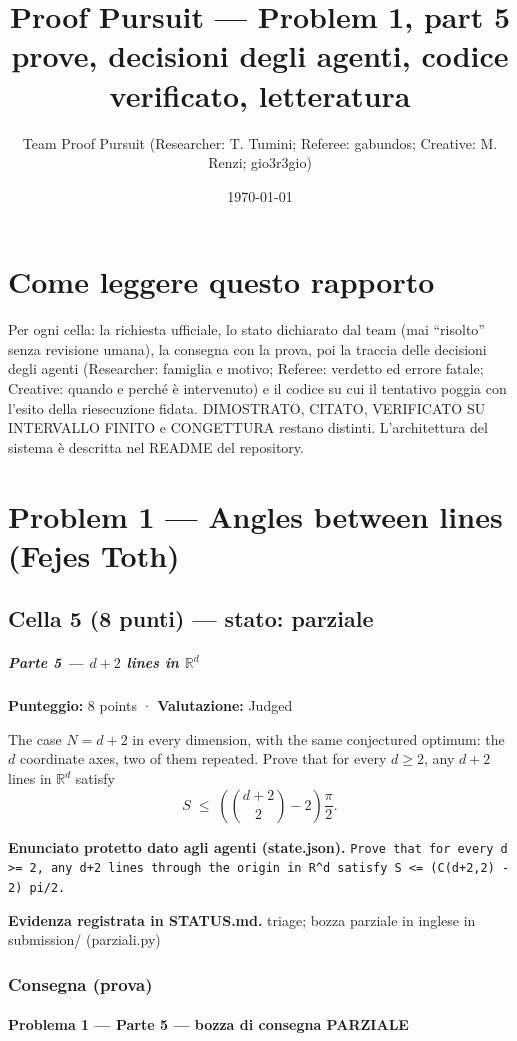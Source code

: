 \documentclass[11pt,a4paper]{article}
\title{Proof Pursuit --- Problem 1, part 5\\ \large prove, decisioni degli agenti, codice verificato, letteratura}
\author{Team Proof Pursuit (Researcher: T. Tumini; Referee: gabundos; Creative: M. Renzi; gio3r3gio)}
\date{\today}
\begin{document}
\maketitle\tableofcontents
\section*{Come leggere questo rapporto}
Per ogni cella: la richiesta ufficiale, lo stato dichiarato dal team (mai ``risolto'' senza revisione umana), la consegna
con la prova, poi la traccia delle decisioni degli agenti (Researcher: famiglia e motivo; Referee: verdetto ed errore
fatale; Creative: quando e perché è intervenuto) e il codice su cui il tentativo poggia con l'esito della riesecuzione
fidata. DIMOSTRATO, CITATO, VERIFICATO SU INTERVALLO FINITO e CONGETTURA restano distinti. L'architettura del sistema
è descritta nel README del repository.
\section{Problem 1 — Angles between lines (Fejes Toth)}
\subsection{Cella 5 (8 punti) — stato: parziale}
\subparagraph{\texorpdfstring{Parte 5 --- \(d+2\) lines in
\(\mathbb{R}^d\)}{Parte 5 --- d+2 lines in \textbackslash mathbb\{R\}\^{}d}}\label{parte-5-d2-lines-in-mathbbrd}

\textbf{Punteggio:} 8 points · \textbf{Valutazione:} Judged

The case \(N = d+2\) in every dimension, with the same conjectured
optimum: the \(d\) coordinate axes, two of them repeated. Prove that for
every \(d \ge 2\), any \(d+2\) lines in \(\mathbb{R}^d\) satisfy \[
S \;\le\; \left( \binom{d+2}{2} - 2 \right) \frac{\pi}{2}.
\]

\textbf{Enunciato protetto dato agli agenti (state.json).} \texttt{Prove that for every d \textgreater{}= 2, any d+2 lines through the origin in R\textasciicircum{}d satisfy S \textless{}= (C(d+2,2) - 2) pi/2.}

\textbf{Evidenza registrata in STATUS.md.} triage; bozza parziale in inglese in submission/ (parziali.py)

\subsubsection{Consegna (prova)}
\paragraph{Problema 1 --- Parte 5 --- bozza di consegna
PARZIALE}\label{problema-1-parte-5-bozza-di-consegna-parziale}
\end{document}
